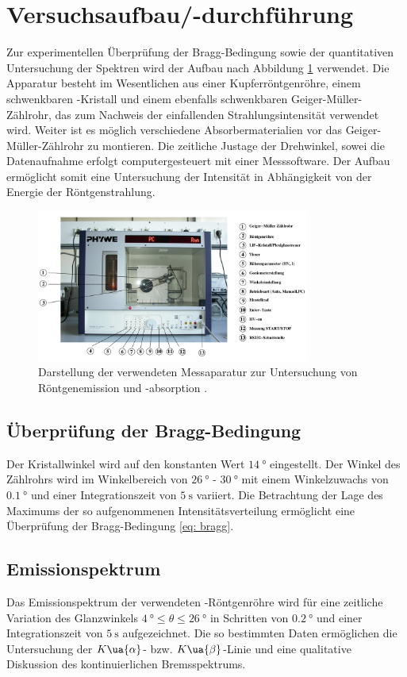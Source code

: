 \section{Versuchsaufbau/-durchführung}
Zur experimentellen Überprüfung der Bragg-Bedingung sowie der quantitativen Untersuchung der Spektren wird der Aufbau nach Abbildung
\ref{fig: aufbau} verwendet. Die Apparatur besteht im Wesentlichen aus einer Kupferröntgenröhre, einem schwenkbaren -Kristall
und einem ebenfalls schwenkbaren Geiger-Müller-Zählrohr, das zum Nachweis der einfallenden Strahlungsintensität verwendet wird.
Weiter ist es möglich verschiedene Absorbermaterialien vor das Geiger-Müller-Zählrohr
zu montieren. Die zeitliche Justage der Drehwinkel, sowei die Datenaufnahme erfolgt computergesteuert mit einer
Messsoftware. Der Aufbau ermöglicht somit eine Untersuchung der Intensität in Abhängigkeit von der Energie
der Röntgenstrahlung.
\begin{figure}
  \centering
  \includegraphics[width = 0.8\textwidth]{pics/aufbau.png}
  \caption{Darstellung der verwendeten Messaparatur zur Untersuchung von Röntgenemission und -absorption \cite{anleitung602}.}
  \label{fig: aufbau}
\end{figure}
\subsection{Überprüfung der Bragg-Bedingung}
Der Kristallwinkel wird auf den konstanten Wert $\SI{14}{\degree}$ eingestellt. Der Winkel des Zählrohrs wird im Winkelbereich
von $\SI{26}{\degree}$ - $\SI{30}{\degree}$ mit einem Winkelzuwachs von $\SI{0.1}{\degree}$ und einer Integrationszeit
von $\SI{5}{\second}$ variiert. Die Betrachtung der Lage des Maximums der so aufgenommenen Intensitätsverteilung ermöglicht eine Überprüfung
der Bragg-Bedingung \eqref{eq: bragg}.

\subsection{Emissionspektrum}
Das Emissionspektrum der verwendeten -Röntgenröhre wird für eine zeitliche Variation des Glanzwinkels
$\SI{4}{\degree} \leq \theta \leq \SI{26}{\degree}$ in Schritten von $\SI{0.2}{\degree}$ und einer Integrationszeit
von $\SI{5}{\second}$ aufgezeichnet. Die so bestimmten Daten ermöglichen die Untersuchung der $K\ua{\alpha}$- bzw.
$K\ua{\beta}$-Linie und eine qualitative Diskussion des kontinuierlichen Bremsspektrums.

